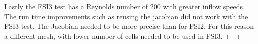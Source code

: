 Lastly the FSI3 test has a Reynolds number of 200 with greater inflow speeds. The run time improvements such as reusing the jacobian did not work with the FSI3 test. The Jacobian needed to be more precise than for FSI2. For this reason a different mesh, with lower number of cells needed to be used in FSI3.  +++

















